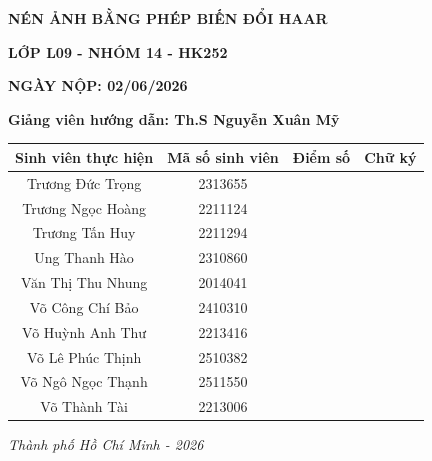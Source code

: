 \begin{titlepage}
\begin{center}
        {\fontsize{20}{15}\selectfont \textbf{NÉN ẢNH BẰNG PHÉP BIẾN ĐỔI HAAR} \par}

        \vspace{0.2cm}
    \end{center}
    
    
    \begin{center}
        {\fontsize{14}{15}\selectfont \textbf{LỚP L09 - NHÓM 14 - HK252} \par}
        \vspace{0.2cm}
        {\fontsize{14}{15}\selectfont \textbf{NGÀY NỘP: 02/06/2026} \par}
        \vspace{0.2cm}
        {\fontsize{14}{15}\selectfont \textbf{Giảng viên hướng dẫn: Th.S Nguyễn Xuân Mỹ} \par}
    \end{center}
    
    \begin{center}
        \vspace{0.3cm}
        \renewcommand{\arraystretch}{1.2}
        \begin{tabular}{|c|c|c|c|}
            \hline
            \textbf{Sinh viên thực hiện} & \textbf{Mã số sinh viên} & \textbf{Điểm số} & \textbf{Chữ ký} \\ \hline
            Trương Đức Trọng & 2313655 &  & \\ \hline
            Trương Ngọc Hoàng & 2211124 &  & \\ \hline
            Trương Tấn Huy & 2211294 &  & \\ \hline
            Ung Thanh Hào & 2310860 &  & \\ \hline
            Văn Thị Thu Nhung & 2014041 &  & \\ \hline
            Võ Công Chí Bảo & 2410310 &  & \\ \hline
            Võ Huỳnh Anh Thư & 2213416 &  & \\ \hline
            Võ Lê Phúc Thịnh & 2510382 &  & \\ \hline
            Võ Ngô Ngọc Thạnh & 2511550 &  & \\ \hline
            Võ Thành Tài & 2213006 &  & \\ \hline
        \end{tabular}
    \end{center}

    \vfill 
    
    \begin{center}
        {\fontsize{13}{15}\selectfont \textit{Thành phố Hồ Chí Minh - 2026}}
    \end{center}

\end{titlepage}
